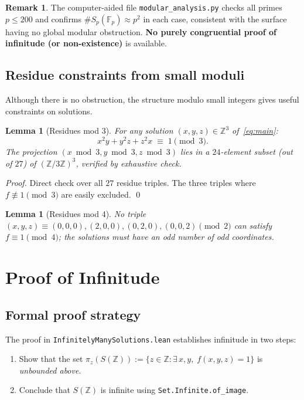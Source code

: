 \documentclass[12pt,a4paper]{article}
\newtheorem{lemma}[theorem]{Lemma}
\theoremstyle{definition}
\newtheorem{remark}[theorem]{Remark}
\newcommand{\Z}{\mathbb{Z}}
\newcommand{\Fp}{\mathbb{F}}
\begin{document}
\begin{remark}
  The computer-aided file \texttt{modular\_analysis.py} checks
  all primes $p \le 200$ and confirms $\#S_p(\Fp_p) \approx p^2$ in
  each case, consistent with the surface having no global modular
  obstruction.  \textbf{No purely congruential proof of infinitude (or
  non-existence)} is available.
\end{remark}

\subsection{Residue constraints from small moduli}

Although there is no obstruction, the structure modulo small integers
gives useful constraints on solutions.

\begin{lemma}[Residues mod 3]\label{lem:mod3}
  For any solution $(x,y,z)\in\Z^3$ of~\eqref{eq:main}:
  \[
    x^2y + y^2z + z^2x \;\equiv\; 1 \pmod 3.
  \]
  The projection $(x\bmod 3, y\bmod 3, z\bmod 3)$ lies in a
  $24$-element subset (out of $27$) of $(\Z/3\Z)^3$, verified by
  exhaustive check.
\end{lemma}

\begin{proof}
  Direct check over all $27$ residue triples.  The three triples where
  $f \not\equiv 1\pmod 3$ are easily excluded. \qed
\end{proof}

\begin{lemma}[Residues mod 4]\label{lem:mod4}
  No triple $(x,y,z)\equiv (0,0,0),(2,0,0),(0,2,0),(0,0,2)
  \pmod 2$ can satisfy $f \equiv 1\pmod 4$; the solutions must have
  an odd number of odd coordinates.
\end{lemma}

\section{Proof of Infinitude}\label{sec:infinite}

\subsection{Formal proof strategy}

The proof in \texttt{InfinitelyManySolutions.lean} establishes infinitude
in two steps:
\begin{enumerate}[label=(\roman*)]
  \item Show that the set
    $\pi_z(S(\Z)) := \{z\in\Z : \exists\,x,y,\;f(x,y,z)=1\}$
    is \emph{unbounded above}.
  \item Conclude that $S(\Z)$ is infinite using
    \texttt{Set.Infinite.of\_image}.
\end{enumerate}
\end{document}
